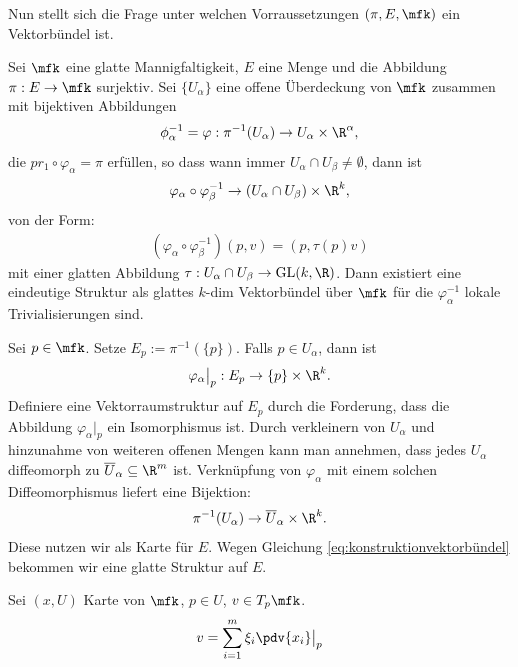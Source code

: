 Nun stellt sich die Frage unter welchen Vorraussetzungen $(\pi, E, \mfk)$ ein Vektorbündel ist.
\begin{lem}
\label{lem:vorraussetzungenvektorbündel}
Sei $\mfk$ eine glatte Mannigfaltigkeit, $E$ eine Menge und die Abbildung $\pi: E\to\mfk$ surjektiv.
Sei $\{ U_\alpha \}$ eine offene Überdeckung von $\mfk$ zusammen mit bijektiven Abbildungen
\begin{align}
\phi^{-1}_{\alpha} = \varphi: \pi^{-1}(U_\alpha) \to U_\alpha \times \R^\alpha,
\end{align}
die $pr_1 \circ \varphi_\alpha = \pi$ erfüllen, so dass wann immer $U_\alpha \cap U_\beta \neq \emptyset$, dann ist 
\begin{align}
\varphi_\alpha \circ \varphi_{\beta}^{-1} \to (U_\alpha \cap U_\beta) \times \R^k,
\end{align}
von der Form:
\begin{align}
\label{eq:konstruktionvektorbündel}
(\varphi_\alpha \circ \varphi_{\beta}^{-1})(p, v) = (p, \tau(p) v)
\end{align}
mit einer glatten Abbildung $\tau: U_\alpha \cap U_\beta \to \mathrm{GL}(k, \R)$.
Dann existiert eine eindeutige Struktur als glattes $k$-dim Vektorbündel über $\mfk$ für die $\varphi^{-1}_{\alpha}$ lokale Trivialisierungen sind.
\end{lem}
\begin{bew}
Sei  $p\in\mfk$. 
Setze $E_p := \pi^{-1}(\{ p \})$. 
Falls $p\in U_\alpha$, dann ist 
\begin{align}
\varphi_\alpha \big\vert_p : E_p \to \{ p \} \times \R^k.
\end{align}
Definiere eine Vektorraumstruktur auf $E_p$ durch die Forderung, dass die Abbildung $\varphi_\alpha \big\vert_p$ ein Isomorphismus ist.
Durch verkleinern von $U_\alpha$ und hinzunahme von weiteren offenen Mengen kann man annehmen, dass jedes $U_\alpha$ diffeomorph zu $\overline{U}_\alpha \subseteq \R^m$ ist.
Verknüpfung von $\varphi_\alpha$ mit einem solchen Diffeomorphismus liefert eine Bijektion:
\begin{align}
\pi^{-1} (U_\alpha) \to \overline{U}_\alpha \times \R^k .
\end{align}
Diese nutzen wir als Karte für $E$.
Wegen Gleichung \ref{eq:konstruktionvektorbündel} bekommen wir eine glatte Struktur auf $E$.
\end{bew}
Sei $(x, U)$ Karte von $\mfk$, $p\in U$, $v\in T_p \mfk$.
\begin{align}
v = \sum_{i=1}^{m} \xi_i \pdv{x_i}\big\vert_p
\end{align}
